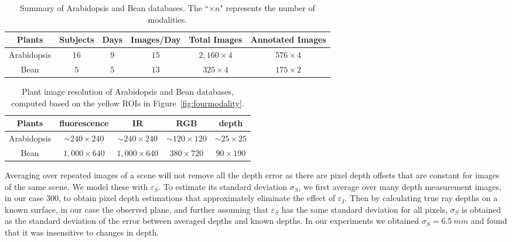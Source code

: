 \begin{table*}[t!]
\begin{center}
\caption{Summary of Arabidopsis and Bean databases. The ``$\times n$" represents the number of modalities.}
\label{tab:stat}
\begin{tabular}{c|c|c|c|c|c}
\hline
Plants & Subjects & Days & Images/Day & Total Images & Annotated Images \\
\hline
Arabidopsis & $16$ & $9$ & $15$ & $2,160\times 4$ & $576\times 4$ \\
\hline
Bean & $5$ & $5$ & $13$ & $325\times 4$ & $175\times 2$ \\
\hline
\end{tabular}
\end{center}
\end{table*}



\begin{table*}
\begin{center}
\caption{Plant image resolution of Arabidopsis and Bean databases, computed based on the yellow ROIs in Figure~\ref{fig:fourmodality}.}
\label{tab:resolution}
\begin{tabular}{c|c|c|c|c}
\hline
Plants & fluorescence & IR & RGB & depth \\
\hline
Arabidopsis & $\sim$$240\times240$ & $\sim$$240\times240$ & $\sim$$120\times120$ & $\sim$$25\times25$ \\
Bean & $1,000\times640$ & $1,000\times640$ & $380\times720$ & $90\times190$ \\
\hline
\end{tabular}
\end{center}
\end{table*}

Averaging over repeated images of a scene will not remove all the depth error as there are pixel depth offsets that are constant for images of the same scene.
We model these with $\varepsilon_S$.
To estimate its standard deviation $\sigma_S$, we first average over many depth measurement images, in our case $300$, to obtain pixel depth estimations that approximately eliminate the effect of $\varepsilon_I$. Then by calculating true ray depths on a known surface, in our case the observed plane, and further assuming that $\varepsilon_S$ has the same standard deviation for all pixels, $\sigma_S$ is obtained as the standard deviation of the error between averaged depths and known depths. In our experiments we obtained $\sigma_S=6.5~mm$ and found that it was insensitive to changes in depth.

